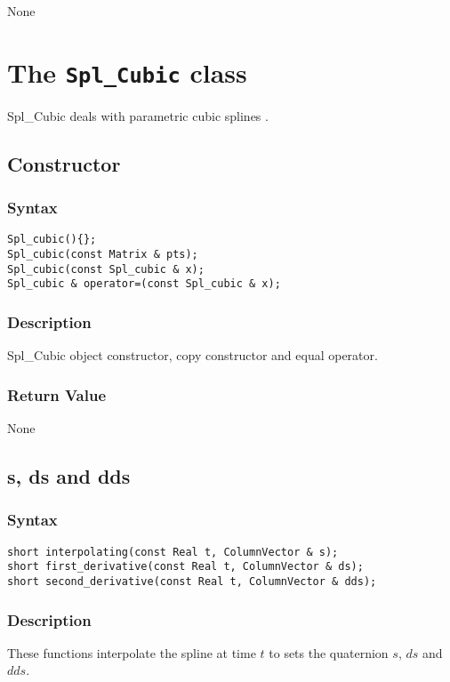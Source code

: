 \documentclass[dvips,11pt,fleqn]{report}
\begin{document}
None

\newpage

\section{The \texttt{Spl\_Cubic} class}

Spl\_Cubic deals with parametric cubic splines \cite{Angeles97}.

\subsection*{Constructor}
\subsubsection*{Syntax}
\begin{verbatim}
Spl_cubic(){};
Spl_cubic(const Matrix & pts);
Spl_cubic(const Spl_cubic & x);
Spl_cubic & operator=(const Spl_cubic & x);
\end{verbatim}

\subsubsection*{Description}   
Spl\_Cubic object constructor, copy constructor and equal operator.

\subsubsection*{Return Value}

None

\newpage

\subsection*{s, ds and dds}
\subsubsection*{Syntax}
\begin{verbatim}
short interpolating(const Real t, ColumnVector & s);
short first_derivative(const Real t, ColumnVector & ds);
short second_derivative(const Real t, ColumnVector & dds);
\end{verbatim}

\subsubsection*{Description}   
These functions interpolate the spline at time $t$ to sets the
quaternion $s$, $ds$ and $dds$.
\end{document}
